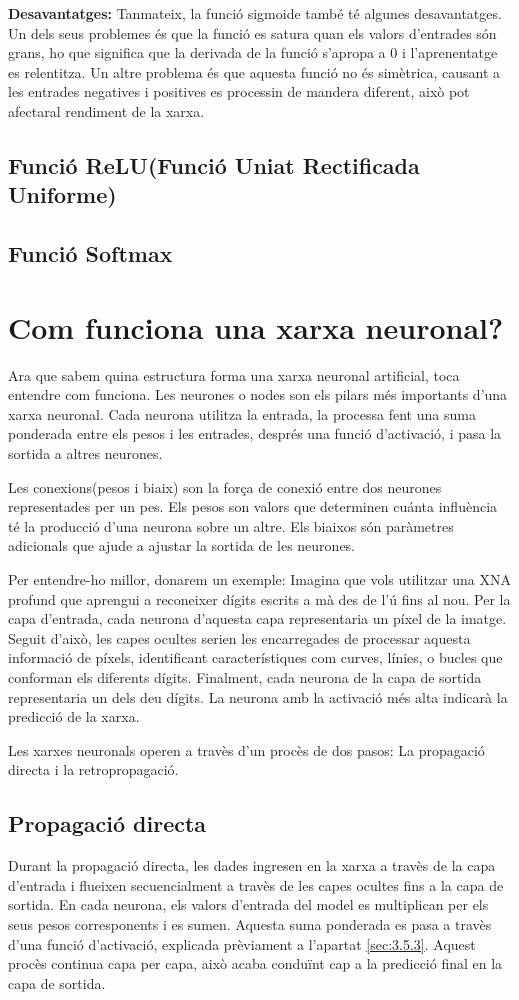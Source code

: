\textbf{Desavantatges:}
Tanmateix, la funció sigmoide també té algunes desavantatges. Un dels seus problemes és que la funció es satura quan els valors d'entrades són grans, ho que significa que la derivada de la funció s'apropa a 0 i l'aprenentatge es relentitza. Un altre problema és que aquesta funció no és simètrica, causant a les entrades negatives i positives es processin de mandera diferent, això pot afectaral rendiment de la xarxa.
\subsection{Funció ReLU(Funció Uniat Rectificada Uniforme)}
\subsection{Funció Softmax}


\section{Com funciona una xarxa neuronal?}
Ara que sabem quina estructura forma una xarxa neuronal artificial, toca entendre com funciona. Les neurones o nodes son els pilars més importants d'una xarxa neuronal. Cada neurona utilitza la entrada, la processa fent una suma ponderada entre els pesos i les entrades, després una funció d'activació, i pasa la sortida a altres neurones.

Les conexions(pesos i biaix) son la força de conexió entre dos neurones representades per un pes. Els pesos son valors que determinen cuánta influència té la producció d'una neurona sobre un altre. Els biaixos són paràmetres adicionals que ajude a ajustar la sortida de les neurones.

Per entendre-ho millor, donarem un exemple: Imagina que vols utilitzar una XNA profund que aprengui a reconeixer dígits escrits a mà des de l'ú fins al nou. Per la capa d'entrada, cada neurona d'aquesta capa representaria un píxel de la imatge. Seguit d'això, les capes ocultes serien les encarregades de processar aquesta informació de píxels, identificant característiques com curves, línies, o bucles que conforman els diferents dígits. Finalment, cada neurona de la capa de sortida representaria un dels deu dígits. La neurona amb la activació més alta indicarà la predicció de la xarxa.

Les xarxes neuronals operen a travès d'un procès de dos pasos: La propagació directa i la retropropagació.

\subsection{Propagació directa}
Durant la propagació directa, les dades ingresen en la xarxa a travès de la capa d'entrada i flueixen secuencialment a travès de les capes ocultes fins a la capa de sortida. En cada neurona, els valors d'entrada del model es multiplican per els seus pesos corresponents i es sumen. Aquesta suma ponderada es pasa a travès d'una funció d'activació, explicada prèviament a l'apartat \ref{sec:3.5.3}. Aquest procès continua capa per capa, això acaba conduïnt cap a la predicció final en la capa de sortida.
